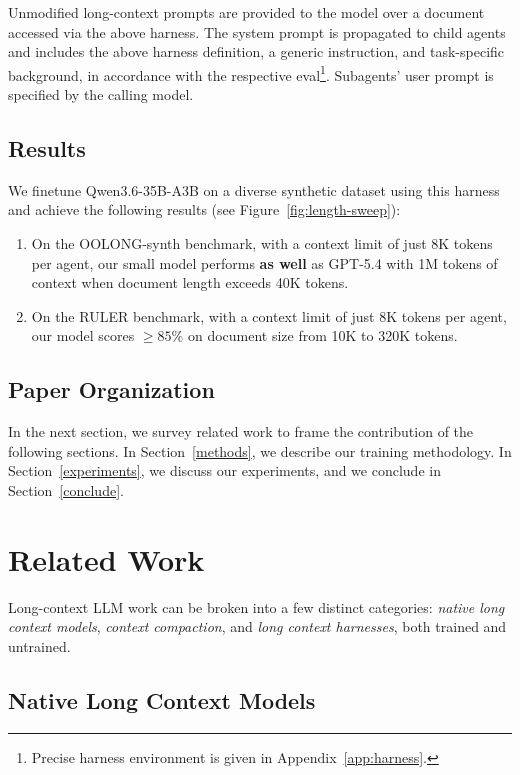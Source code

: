 Unmodified long-context prompts are provided to the model over a document accessed via the above harness. The system prompt is propagated to child agents and includes the above harness definition, a generic instruction, and task-specific background, in accordance with the respective eval\footnote{Precise harness environment is given in Appendix~\ref{app:harness}.}. Subagents' user prompt is specified by the calling model.

\subsection{Results}

We finetune Qwen3.6-35B-A3B on a diverse synthetic dataset using this harness and achieve the following results (see Figure~\ref{fig:length-sweep}):
\begin{enumerate}
  \item On the OOLONG-synth benchmark, with a context limit of just 8K tokens per agent, our small model performs \textbf{as well} as GPT-5.4 with 1M tokens of context when document length exceeds 40K tokens.
  \item On the RULER benchmark, with a context limit of just 8K tokens per agent, our model scores $\geq85\%$ on document size from 10K to 320K tokens.
\end{enumerate}

\subsection{Paper Organization}

In the next section, we survey related work to frame the contribution of the following sections. In Section~\ref{methods}, we describe our training methodology. In Section~\ref{experiments}, we discuss our experiments, and we conclude in Section~\ref{conclude}.

\section{Related Work}
\label{related}

Long-context LLM work can be broken into a few distinct categories: \emph{native long context models}, \emph{context compaction}, and \emph{long context harnesses}, both trained and untrained.

\subsection{Native Long Context Models}

